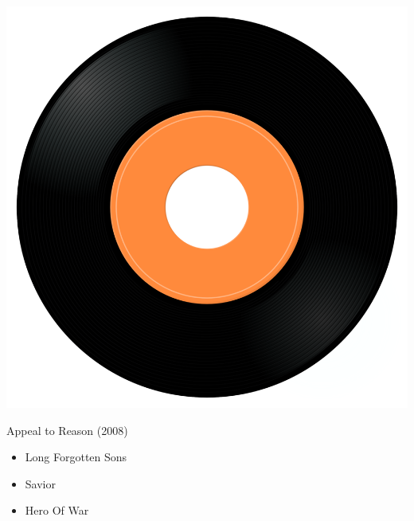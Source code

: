 \begin{minipage}[t]{0.25\textwidth}
\captionsetup{type=figure}
\includegraphics[width=\textwidth]{Images/cover.png}
\caption*{Appeal to Reason (2008)}
\end{minipage}
\begin{minipage}[t]{0.25\textwidth}\vspace{0pt}
\begin{itemize}[nosep,leftmargin=1em,labelwidth=*,align=left]
	\setlength{\itemsep}{0pt}
	\item Long Forgotten Sons
	\item Savior
	\item Hero Of War
\end{itemize}
\end{minipage}
